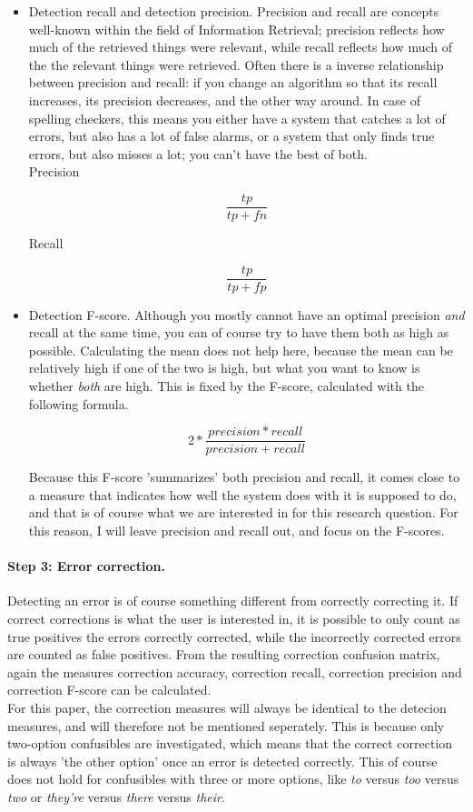 \documentclass[12pt]{article}
\begin{document}
\begin{itemize}
\item Detection recall and detection precision. 
Precision and recall are concepts well-known within the field of Information Retrieval; precision reflects how much of the retrieved things were relevant, while recall reflects how much of the the relevant things were retrieved. Often there is a inverse relationship between precision and recall: if you change an algorithm so that its recall increases, its precision decreases, and the other way around. In case of spelling checkers, this means you either have a system that catches a lot of errors, but also has a lot of false alarms, or a system that only finds true errors, but also misses a lot; you can't have the best of both. \\

Precision

\[
\frac{tp}{tp+fn}
\]

Recall

\[
\frac{tp}{tp+fp}
\]

\item Detection F-score. 
Although you mostly cannot have an optimal precision \emph{and} recall at the same time, you can of course try to have them both as high as possible. Calculating the mean does not help here, because the mean can be relatively high if one of the two is high, but what you want to know is whether \emph{both} are high. This is fixed by the F-score, calculated with the following formula.

\[
2 * \frac{precision * recall}{precision + recall}
\]

Because this F-score 'summarizes' both precision and recall, it comes close to a measure that indicates how well the system does with it is supposed to do, and that is of course what we are interested in for this research question. For this reason, I will leave precision and recall out, and focus on the F-scores.

\end{itemize}

\paragraph{Step 3: Error correction.} Detecting an error is of course something different from correctly correcting it. If correct corrections is what the user is interested in, it is possible to only count as true positives the errors correctly corrected, while the incorrectly corrected errors are counted as false positives. From the resulting correction confusion matrix, again the measures correction accuracy, correction recall, correction precision and correction F-score can be calculated. \\\indent
For this paper, the correction measures will always be identical to the detecion measures, and will therefore not be mentioned seperately. This is because only two-option confusibles are investigated, which means that the correct correction is always 'the other option' once an error is detected correctly. This of course does not hold for confusibles with three or more options, like \emph{to} versus \emph{too} versus \emph{two} or \emph{they're} versus \emph{there} versus \emph{their}.
\end{document}
